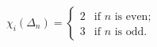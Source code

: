 $\chi_i(\Delta_n) = \begin{cases} 2 & \text{if } n \text{ is even;} \\ 3 & \text{if } n \text{ is odd.} \end{cases}$
